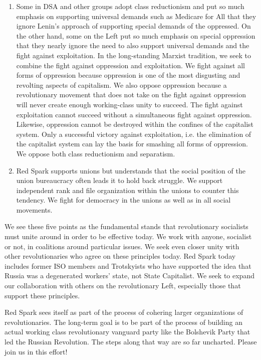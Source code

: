 \begin{enumerate}
\item Some in DSA and other groups adopt class reductionism and put so much emphasis on supporting universal demands such as Medicare for All that they ignore Lenin's approach of supporting special demands of the oppressed. On the other hand, some on the Left put so much emphasis on special oppression that they nearly ignore the need to also support universal demands and the fight against exploitation. In the long-standing Marxist tradition, we seek to combine the fight against oppression and exploitation. We fight against all forms of oppression because oppression is one of the most disgusting and revolting aspects of capitalism. We also oppose oppression because a revolutionary movement that does not take on the fight against oppression will never create enough working-class unity to succeed. The fight against exploitation cannot succeed without a simultaneous fight against oppression. Likewise, oppression cannot be destroyed within the confines of the capitalist system. Only a successful victory against exploitation, i.e. the elimination of the capitalist system can lay the basis for smashing all forms of oppression. We oppose both class reductionism and separatism.
\item Red Spark supports unions but understands that the social position of the union bureaucracy often leads it to hold back struggle. We support independent rank and file organization within the unions to counter this tendency. We fight for democracy in the unions as well as in all social movements.
\end{enumerate}

We see these five points as the fundamental stands that revolutionary socialists must unite around in order to be effective today. We work with anyone, socialist or not, in coalitions around particular issues. We seek even closer unity with other revolutionaries who agree on these principles today. Red Spark today includes former ISO members and Trotskyists who have supported the idea that Russia was a degenerated workers' state, not State Capitalist. We seek to expand our collaboration with others on the revolutionary Left, especially those that support these principles.

Red Spark sees itself as part of the process of cohering larger organizations of revolutionaries. The long-term goal is to be part of the process of building an actual working class revolutionary vanguard party like the Bolshevik Party that led the Russian Revolution. The steps along that way are so far uncharted. Please join us in this effort!
